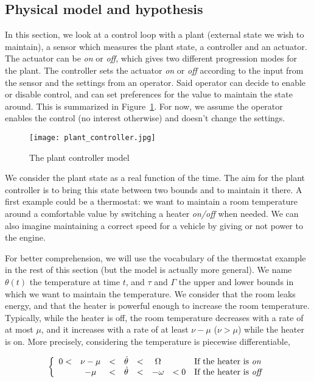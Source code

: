 \subsection{Physical model and hypothesis}

In this section, we look at a control loop with a plant (external state we wish to maintain), a sensor which measures the plant state, a controller and an actuator. The actuator can be \textit{on} or \textit{off}, which gives two different progression modes for the plant. 
The controller sets the actuator \textit{on} or \textit{off} according to the input from the sensor and the settings from an operator.
Said operator can decide to enable or disable control, and can set preferences for the value to maintain the state around. This is summarized in Figure~\ref{plant}. For now, we assume the operator enables the control (no interest otherwise) and doesn't change the settings.

\begin{figure}[ht]
\begin{center}
\texttt{[image: plant\_controller.jpg]}
\caption{The plant controller model}\label{plant}
\end{center}
\end{figure}


We consider the plant state as a real function of the time. The aim for the plant controller is to bring this state between two bounds and to maintain it there. A first example could be a thermostat: we want to maintain a room temperature around a comfortable value by switching a heater \textit{on/off} when needed.
We can also imagine maintaining a correct speed for a vehicle by giving or not power to the engine.

For better comprehension, we will use the vocabulary of the thermostat example in the rest of this section (but the model is actually more general).
We name $\theta (t)$ the temperature at time $t$, and $\tau$ and $\Gamma$ the upper and lower bounds in which we want to maintain the temperature.
We consider that the room leaks energy, and that the heater is powerful enough to increase the room temperature. Typically, while the heater is off, the room temperature decreases with a rate of at most $\mu$, and it increases with a rate of at least $\nu - \mu$ ($\nu > \mu$) while the heater is on. More precisely, considering the temperature is piecewise differentiable,

\[ \left\{ \begin{array}{rcccccll}
0 < & \nu - \mu & < & \dot \theta & < & \Omega   &    &\textrm{If the heater is \textit{on}}\\
    &- \mu    &   < & \dot \theta & < & - \omega & < 0 & \textrm{If the heater is \textit{off}}
\end{array}\right. \]

